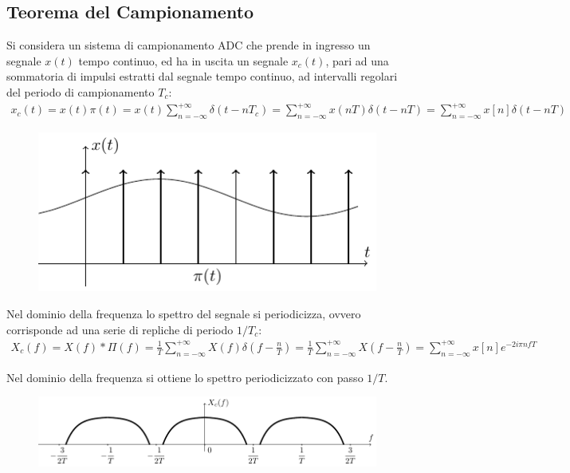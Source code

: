 \documentclass{article}
\numberwithin{equation}{subsection}
\begin{document}
\subsection{Teorema del Campionamento}
\label{sec:teorema-campionamento}

Si considera un sistema di campionamento ADC che prende in ingresso un segnale $x(t)$ tempo continuo, ed ha in uscita un segnale $x_c(t)$, pari ad una 
sommatoria di impulsi estratti dal segnale tempo continuo, ad intervalli regolari del periodo di campionamento $T_c$:
\begin{gather*}
    x_c(t)=x(t)\pi(t)=x(t)\displaystyle\sum_{n=-\infty}^{+\infty}\delta(t-nT_c)=\sum_{n=-\infty}^{+\infty}x(nT)\delta(t-nT)=\sum_{n=-\infty}^{+\infty}x[n]\delta(t-nT)
\end{gather*}
\begin{figure}[H]%
    \centering
    \includegraphics{segnale-campionato.pdf}%
\end{figure}
Nel dominio della frequenza lo spettro del segnale si periodicizza, ovvero corrisponde ad una serie di repliche di periodo $1/T_c$:
\begin{gather*}
    X_c(f)=X(f)*\Pi(f)=\displaystyle\frac{1}{T}\sum_{n=-\infty}^{+\infty}X(f)\delta\left(f-\frac{n}{T}\right)=\frac{1}{T}\sum_{n=-\infty}^{+\infty}X\left(f-\frac{n}{T}\right)=\sum_{n=-\infty}^{+\infty}x[n]e^{-2i\pi nfT}
\end{gather*}

Nel dominio della frequenza si ottiene lo spettro periodicizzato con passo $1/T$. 
\begin{figure}[H]%
    \centering
    \includegraphics{segnale-campionato-frequenza.pdf}%
\end{figure}
\end{document}
